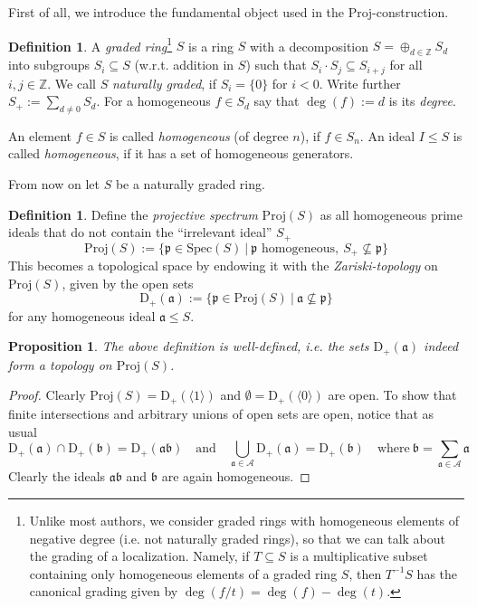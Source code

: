 \documentclass{scrartcl}
\newcommand{\Z}{\mathbb{Z}}
\newcommand{\D}[1]{\mathrm{D}_+(#1)}
\newcommand{\p}{\mathfrak{p}}
\renewcommand{\a}{\mathfrak{a}}
\renewcommand{\b}{\mathfrak{b}}
\newcommand{\Spec}{\mathrm{Spec}}
\newcommand{\Proj}{\mathrm{Proj}}
\newtheorem{prop}[subsection]{Proposition}
\theoremstyle{definition}
\newtheorem{definition}[subsection]{Definition}
\begin{document}
First of all, we introduce the fundamental object used in the $\Proj$-construction.
\begin{definition}
    A \emph{graded ring}\footnote{
        Unlike most authors, we consider graded rings with homogeneous elements of negative degree (i.e. not naturally graded rings), so that we can talk about the grading of a localization.
        Namely, if $T \subseteq S$ is a multiplicative subset containing only homogeneous elements of a graded ring $S$, then $T^{-1}S$ has the canonical grading given by $\deg(f/t) = \deg(f) - \deg(t)$.
    } $S$ is a ring $S$ with a decomposition $S = \oplus_{d \in \Z} S_d$ into subgroups $S_i \subseteq S$ (w.r.t. addition in $S$) such that $S_i \cdot S_j \subseteq S_{i + j}$ for all $i, j \in \Z$.
    We call $S$ \emph{naturally graded}, if $S_i = \{ 0 \}$ for $i < 0$.
    Write further $S_+ := \sum_{d \neq 0} S_d$.
    For a homogeneous $f \in S_d$ say that $\deg(f) := d$ is its \emph{degree}.

    An element $f \in S$ is called \emph{homogeneous} (of degree $n$), if $f \in S_n$.
    An ideal $I \leq S$ is called \emph{homogeneous}, if it has a set of homogeneous generators.
\end{definition}
From now on let $S$ be a naturally graded ring.
\begin{definition}
    Define the \emph{projective spectrum} $\Proj(S)$ as all homogeneous prime ideals that do not contain the ``irrelevant ideal'' $S_+$
    \begin{equation*}
        \Proj(S) := \{ \p \in \Spec(S) \ | \ \text{$\p$ homogeneous}, \ S_+ \not\subseteq \p \}
    \end{equation*}
    This becomes a topological space by endowing it with the \emph{Zariski-topology} on $\Proj(S)$, given by the open sets
    \begin{equation*}
        \D{\a} := \{ \p \in \Proj(S) \ | \ \a \not\subseteq \p \}
    \end{equation*}
    for any homogeneous ideal $\a \leq S$.
\end{definition}
\begin{prop}
    The above definition is well-defined, i.e. the sets $\D{\a}$ indeed form a topology on $\Proj(S)$.
\end{prop}
\begin{proof}
    Clearly $\Proj(S) = \D{\langle 1 \rangle}$ and $\emptyset = \D{\langle 0 \rangle}$ are open.
    To show that finite intersections and arbitrary unions of open sets are open, notice that as usual
    \begin{equation*}
        \D{\a} \cap \D{\b} = \D{\a\b} \quad \text{and} \quad \bigcup_{\a \in \mathcal{A}} \D{\a} = \D{\b} \quad \text{where} \ \b = \sum_{\a \in \mathcal{A}} \a
    \end{equation*}
    Clearly the ideals $\a\b$ and $\b$ are again homogeneous.
\end{proof}
\end{document}
